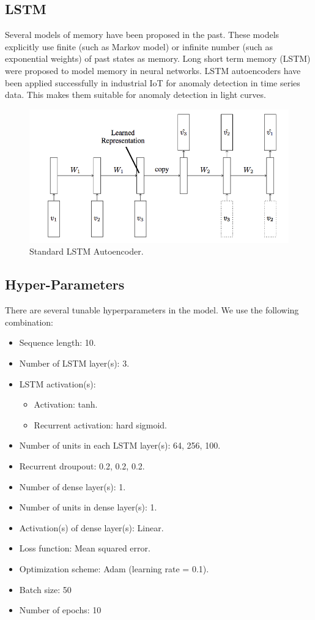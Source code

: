 \documentclass[%
aip,
amsmath,amssymb,
reprint,%
]{revtex4-1}
\begin{document}
\subsection{LSTM}

Several models of memory have been proposed in the past. These models explicitly use finite (such as Markov model) or infinite number (such as exponential weights) of past states as memory. Long short term memory (LSTM) were proposed to model memory in neural networks. LSTM autoencoders have been applied successfully in industrial IoT for anomaly detection in time series data. This makes them suitable for anomaly detection in light curves.

\begin{figure}[h!]
	\includegraphics[width=\linewidth]{LSTM-Autoencoder-Model.png}
	\caption{Standard LSTM Autoencoder.}
	\label{fig:lstm_autoenc}
\end{figure}

\subsection{Hyper-Parameters}

There are several tunable hyperparameters in the model. We use the following combination:

\begin{itemize}
  \item Sequence length: 10.
  \item Number of LSTM layer(s): 3.
  \item LSTM activation(s):
  \begin{itemize}
      \item Activation: tanh.
      \item Recurrent activation: hard sigmoid.
  \end{itemize}
  \item Number of units in each LSTM layer(s): 64, 256, 100.
  \item Recurrent droupout: 0.2, 0.2, 0.2.
  \item Number of dense layer(s): 1.
  \item Number of units in dense layer(s): 1.
  \item Activation(s) of dense layer(s): Linear.
  \item Loss function: Mean squared error.
  \item Optimization scheme: Adam (learning rate = 0.1).
  \item Batch size: 50
  \item Number of epochs: 10
\end{itemize}
\end{document}
